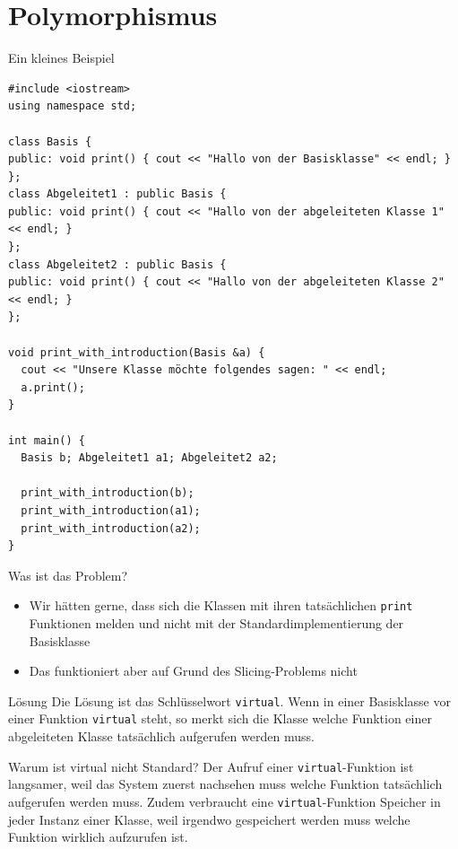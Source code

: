 \documentclass[presentation]{beamer}
\begin{document}
\section{Polymorphismus}
\label{sec:org173090b}
\begin{frame}[fragile,label={sec:org9487e85}]{Ein kleines Beispiel}
 \begin{verbatim}
#include <iostream>
using namespace std;

class Basis {
public: void print() { cout << "Hallo von der Basisklasse" << endl; }
};
class Abgeleitet1 : public Basis {
public: void print() { cout << "Hallo von der abgeleiteten Klasse 1" << endl; }
};
class Abgeleitet2 : public Basis {
public: void print() { cout << "Hallo von der abgeleiteten Klasse 2" << endl; }
};

void print_with_introduction(Basis &a) {
  cout << "Unsere Klasse möchte folgendes sagen: " << endl;
  a.print();
}

int main() {
  Basis b; Abgeleitet1 a1; Abgeleitet2 a2;

  print_with_introduction(b);
  print_with_introduction(a1);
  print_with_introduction(a2);
}
\end{verbatim}
\end{frame}
\begin{frame}[fragile,label={sec:org7a31f20}]{Was ist das Problem?}
 \begin{itemize}
\item Wir hätten gerne, dass sich die Klassen mit ihren tatsächlichen
{\color{solarizedYellow}\texttt{print} }Funktionen melden und nicht mit der Standardimplementierung
der Basisklasse
\item Das funktioniert aber auf Grund des Slicing-Problems nicht
\end{itemize}
\begin{block}{Lösung}
Die Lösung ist das Schlüsselwort {\color{solarizedYellow}\texttt{virtual}}. Wenn in einer Basisklasse
vor einer Funktion {\color{solarizedYellow}\texttt{virtual} }steht, so merkt sich die Klasse welche
Funktion einer abgeleiteten Klasse tatsächlich aufgerufen werden muss.
\end{block}
\begin{block}{Warum ist virtual nicht Standard?}
Der Aufruf einer {\color{solarizedYellow}\texttt{virtual}}-Funktion ist langsamer, weil das System
zuerst nachsehen muss welche Funktion tatsächlich aufgerufen werden
muss. Zudem verbraucht eine {\color{solarizedYellow}\texttt{virtual}}-Funktion Speicher in jeder
Instanz einer Klasse, weil irgendwo gespeichert werden muss welche
Funktion wirklich aufzurufen ist.
\end{block}
\end{frame}
\end{document}
